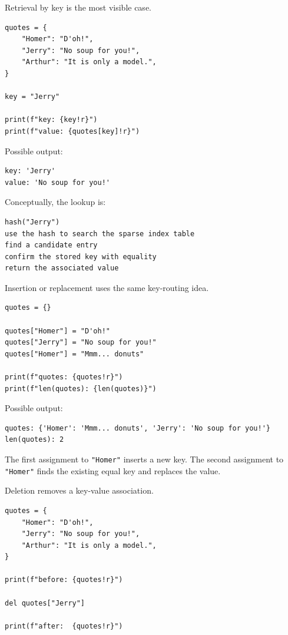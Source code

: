 Retrieval by key is the most visible case.

\begin{verbatim}
quotes = {
    "Homer": "D'oh!",
    "Jerry": "No soup for you!",
    "Arthur": "It is only a model.",
}

key = "Jerry"

print(f"key: {key!r}")
print(f"value: {quotes[key]!r}")
\end{verbatim}

Possible output:

\begin{verbatim}
key: 'Jerry'
value: 'No soup for you!'
\end{verbatim}

Conceptually, the lookup is:

\begin{verbatim}
hash("Jerry")
use the hash to search the sparse index table
find a candidate entry
confirm the stored key with equality
return the associated value
\end{verbatim}

Insertion or replacement uses the same key-routing idea.

\begin{verbatim}
quotes = {}

quotes["Homer"] = "D'oh!"
quotes["Jerry"] = "No soup for you!"
quotes["Homer"] = "Mmm... donuts"

print(f"quotes: {quotes!r}")
print(f"len(quotes): {len(quotes)}")
\end{verbatim}

Possible output:

\begin{verbatim}
quotes: {'Homer': 'Mmm... donuts', 'Jerry': 'No soup for you!'}
len(quotes): 2
\end{verbatim}

The first assignment to \texttt{"Homer"} inserts a new key. The second assignment to \texttt{"Homer"} finds the existing equal key and replaces the value.

Deletion removes a key-value association.

\begin{verbatim}
quotes = {
    "Homer": "D'oh!",
    "Jerry": "No soup for you!",
    "Arthur": "It is only a model.",
}

print(f"before: {quotes!r}")

del quotes["Jerry"]

print(f"after:  {quotes!r}")
\end{verbatim}

